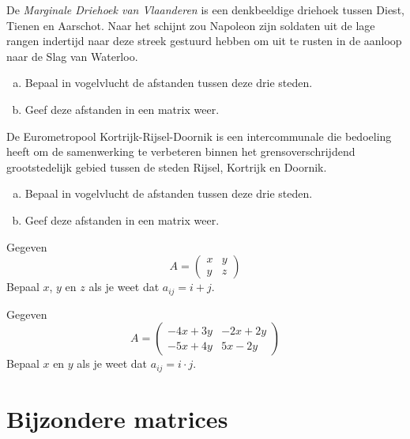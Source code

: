 \documentclass[12pt,twoside]{article}
\begin{document}
\begin{oefening}
De {\em Marginale Driehoek van Vlaanderen} is een denkbeeldige driehoek tussen Diest, Tienen en Aarschot. Naar het schijnt zou Napoleon zijn soldaten uit de lage rangen indertijd naar deze streek gestuurd hebben om uit te rusten in de aanloop naar de Slag van Waterloo.
\begin{enumerate}[(a)]
  \item Bepaal in vogelvlucht de afstanden tussen deze drie steden.
  \item Geef deze afstanden in een matrix weer.
\end{enumerate}
\end{oefening}

\begin{oefening}
De Eurometropool Kortrijk-Rijsel-Doornik is een intercommunale die bedoeling heeft om de samenwerking te verbeteren binnen het grensoverschrijdend grootstedelijk gebied tussen de steden Rijsel, Kortrijk en Doornik.
\begin{enumerate}[(a)]
  \item Bepaal in vogelvlucht de afstanden tussen deze drie steden.
  \item Geef deze afstanden in een matrix weer.
\end{enumerate}
\end{oefening}

\begin{oefening}
Gegeven
$$A=\begin{pmatrix}
  x & y\\
  y & z
\end{pmatrix}$$
Bepaal $x$, $y$ en $z$ als je weet dat $a_{ij}=i+j$.
\end{oefening}

\begin{oefening}
Gegeven
$$A=\begin{pmatrix}
  -4x+3y & -2x+2y\\
  -5x+4y & 5x-2y
\end{pmatrix}$$
Bepaal $x$ en $y$ als je weet dat $a_{ij}=i\cdot j$.
\end{oefening}


\pagebreak

\section{Bijzondere matrices}
\end{document}
